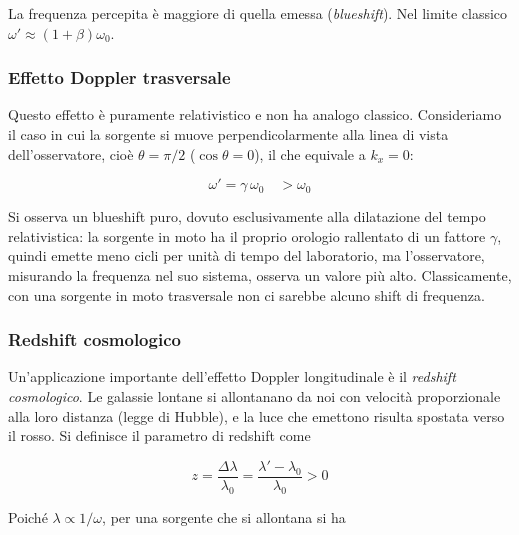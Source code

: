 La frequenza percepita è maggiore di quella emessa (\emph{blueshift}). Nel limite classico $\omega' \approx (1+\beta)\omega_0$.

\subsubsection*{Effetto Doppler trasversale}

Questo effetto è puramente relativistico e non ha analogo classico. Consideriamo il caso in cui la sorgente si muove perpendicolarmente alla linea di vista dell'osservatore, cioè $\theta = \pi/2$ ($\cos\theta = 0$), il che equivale a $k_x = 0$:

\begin{tcolorbox}[colback=yellow!10!white, colframe=orange!70!black, boxrule=0.8pt]
\begin{equation}
    \omega' = \gamma\,\omega_0 \quad > \omega_0
\end{equation}
\end{tcolorbox}

Si osserva un blueshift puro, dovuto esclusivamente alla dilatazione del tempo relativistica: la sorgente in moto ha il proprio orologio rallentato di un fattore $\gamma$, quindi emette meno cicli per unità di tempo del laboratorio, ma l'osservatore, misurando la frequenza nel suo sistema, osserva un valore più alto. Classicamente, con una sorgente in moto trasversale non ci sarebbe alcuno shift di frequenza.

\subsubsection*{Redshift cosmologico}

Un'applicazione importante dell'effetto Doppler longitudinale è il \emph{redshift cosmologico}. Le galassie lontane si allontanano da noi con velocità proporzionale alla loro distanza (legge di Hubble), e la luce che emettono risulta spostata verso il rosso. Si definisce il parametro di redshift come

\begin{tcolorbox}[colback=yellow!10!white, colframe=orange!70!black, boxrule=0.8pt]
\begin{equation}
    z = \frac{\Delta\lambda}{\lambda_0} = \frac{\lambda' - \lambda_0}{\lambda_0} > 0
\end{equation}
\end{tcolorbox}

Poiché $\lambda \propto 1/\omega$, per una sorgente che si allontana si ha

